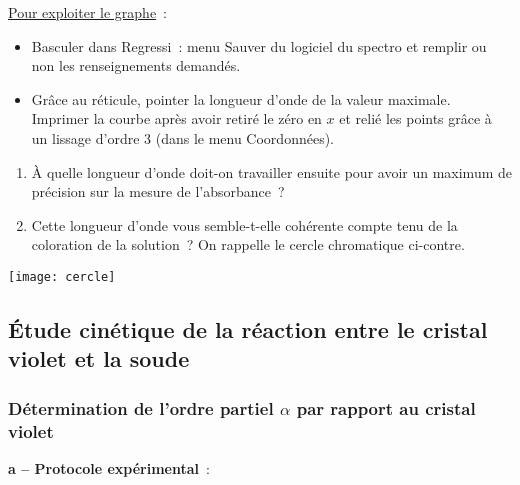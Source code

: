 \documentclass[a4paper, 11pt, final, garamond]{book}
\begin{document}
\begin{minipage}{0.7\linewidth} \underline{Pour exploiter le graphe}~:
    \begin{itemize}
        \item Basculer dans Regressi~: menu Sauver du logiciel du spectro et
            remplir ou non les renseignements demandés.
        \item Grâce au réticule, pointer la longueur d'onde de la valeur
            maximale. Imprimer la courbe après avoir retiré le zéro en $x$ et
            relié les points grâce à un lissage d'ordre 3 (dans le menu
            Coordonnées).
    \end{itemize}
    \begin{enumerate}[label*=\protect\fbox{\arabic{enumi}}, start=7]
        \item À quelle longueur d'onde doit-on travailler ensuite pour avoir un
            maximum de précision sur la mesure de l'absorbance~?
        \item Cette longueur d'onde vous semble-t-elle cohérente compte tenu de
            la coloration de la solution~? On rappelle le cercle chromatique
            ci-contre. 
    \end{enumerate}
\end{minipage}
\begin{minipage}{0.3\linewidth}
    \begin{center}
        \texttt{[image: cercle]}
    \end{center}
\end{minipage}

\subsection{Étude cinétique de la réaction entre le cristal violet et la soude}
\subsubsection{Détermination de l'ordre partiel $\alpha$ par rapport au cristal violet}

\textbf{a -- Protocole expérimental}~:
\end{document}
